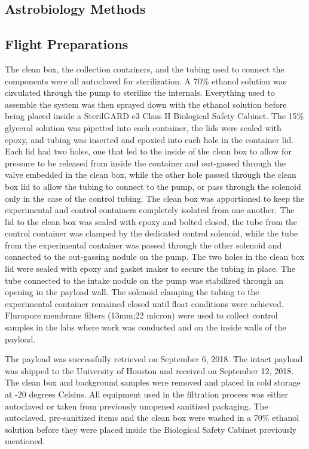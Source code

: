 \subsection{Astrobiology Methods}
\label{sec:Astrobiology Methods}
\subsection{ Flight Preparations }
 The clean box, the collection containers, and the tubing used to connect the components were all autoclaved for sterilization. A 70\% ethanol solution was circulated through the pump to sterilize the internals. Everything used to assemble the system was then sprayed down with the ethanol solution before being placed inside a SterilGARD e3 Class II Biological Safety Cabinet. The 15\% glycerol solution was pipetted into each container, the lids were sealed with epoxy, and tubing was inserted and epoxied into each hole in the container lid. Each lid had two holes, one that led to the inside of the clean box to allow for pressure to be released from inside the container and out-gassed through the valve embedded in the clean box, while the other hole passed through the clean box lid to allow the tubing to connect to the pump, or pass through the solenoid only in the case of the control tubing. The clean box was apportioned to keep the experimental and control containers completely isolated from one another. The lid to the clean box was sealed with epoxy and bolted closed, the tube from the control container was clamped by the dedicated control solenoid, while the tube from the experimental container was passed through the other solenoid and connected to the out-gassing nodule on the pump. The two holes in the clean box lid were sealed with epoxy and gasket maker to secure the tubing in place. The tube connected to the intake nodule on the pump was stabilized through an opening in the payload wall. The solenoid clamping the tubing to the experimental container remained closed until float conditions were achieved. Fluropore membrane filters (13mm;22 micron) were used to collect control samples in the labs where work was conducted and on the inside walls of the payload. 
 
 The payload was successfully retrieved on September 6, 2018. The intact payload was shipped to the University of Houston and received on September 12, 2018. The clean box and background samples were removed and placed in cold storage at -20 degrees Celsius.
 All equipment used in the filtration process was either autoclaved or taken from previously unopened sanitized packaging. The autoclaved, pre-sanitized items and the clean box were washed in a 70\% ethanol solution before they were placed inside the Biological Safety Cabinet previously mentioned. 
 
